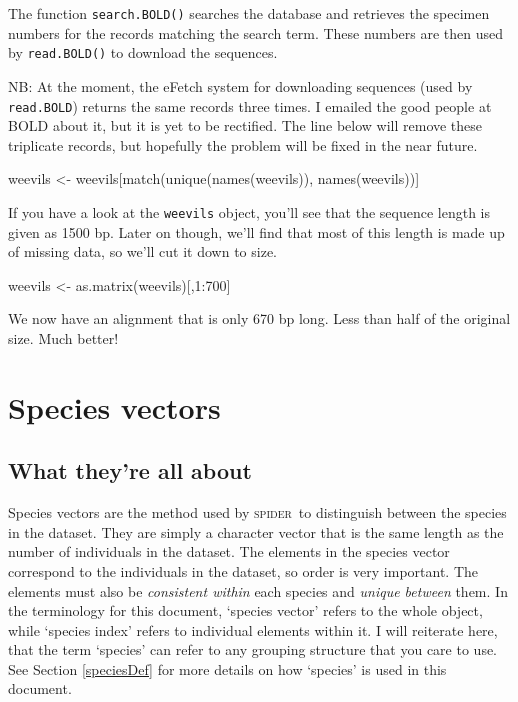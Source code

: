 \documentclass{article}
\newcommand{\spider}{\textsc{spider}~} %
\newcommand{\fun}[1]{\texttt{#1}}
\begin{document}
The function \fun{search.BOLD()} searches the database and retrieves the specimen numbers for the records matching the search term. These numbers are then used by \fun{read.BOLD()} to download the sequences.

NB: At the moment, the eFetch system for downloading sequences (used by \fun{read.BOLD}) returns the same records three times. I emailed the good people at BOLD about it, but it is yet to be rectified. The line below will remove these triplicate records, but hopefully the problem will be fixed in the near future.

\begin{console}
weevils <- weevils[match(unique(names(weevils)), names(weevils))]
\end{console}

If you have a look at the \fun{weevils} object, you'll see that the sequence length is given as 1500 bp. Later on though, we'll find that most of this length is made up of missing data, so we'll cut it down to size.

\begin{console}
weevils <- as.matrix(weevils)[,1:700]
\end{console}

We now have an alignment that is only 670 bp long. Less than half of the original size. Much better!



\section{Species vectors}
\label{species.vectors}

\subsection{What they're all about}
Species vectors are the method used by \spider to distinguish between the species in the dataset. They are simply a character vector that is the same length as the number of individuals in the dataset. The elements in the species vector correspond to the individuals in the dataset, so order is very important. The elements must also be \emph{consistent within} each species and \emph{unique between} them. In the terminology for this document, `species vector' refers to the whole object, while `species index' refers to individual elements within it. I will reiterate here, that the term `species' can refer to any grouping structure that you care to use. See Section \ref{speciesDef} for more details on how `species' is used in this document.
\end{document}
